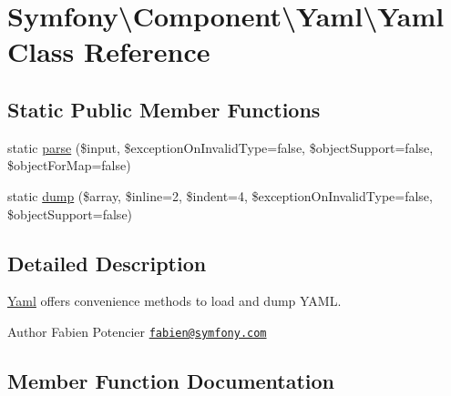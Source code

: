 \hypertarget{classSymfony_1_1Component_1_1Yaml_1_1Yaml}{}\section{Symfony\textbackslash{}Component\textbackslash{}Yaml\textbackslash{}Yaml Class Reference}
\label{classSymfony_1_1Component_1_1Yaml_1_1Yaml}
\subsection*{Static Public Member Functions}
\begin{DoxyCompactItemize}
\item 
static \hyperlink{classSymfony_1_1Component_1_1Yaml_1_1Yaml_ab69c943aac9b8f35804aeccd8a744f24}{parse} (\$input, \$exception\+On\+Invalid\+Type=false, \$object\+Support=false, \$object\+For\+Map=false)
\item 
static \hyperlink{classSymfony_1_1Component_1_1Yaml_1_1Yaml_a42305bd522e889822887acbf38286972}{dump} (\$array, \$inline=2, \$indent=4, \$exception\+On\+Invalid\+Type=false, \$object\+Support=false)
\end{DoxyCompactItemize}


\subsection{Detailed Description}
\hyperlink{classSymfony_1_1Component_1_1Yaml_1_1Yaml}{Yaml} offers convenience methods to load and dump Y\+A\+ML.

\begin{DoxyAuthor}{Author}
Fabien Potencier \href{mailto:fabien@symfony.com}{\tt fabien@symfony.\+com} 
\end{DoxyAuthor}


\subsection{Member Function Documentation}
